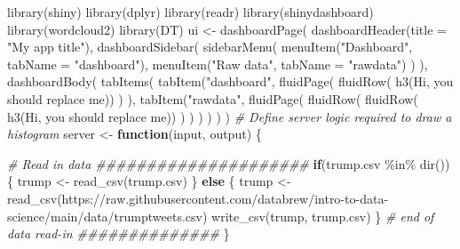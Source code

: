 \documentclass[
]{book}
\newenvironment{Shaded}{\begin{snugshade}}{\end{snugshade}}
\newcommand{\AttributeTok}[1]{\textcolor[rgb]{0.77,0.63,0.00}{#1}}
\newcommand{\CommentTok}[1]{\textcolor[rgb]{0.56,0.35,0.01}{\textit{#1}}}
\newcommand{\ControlFlowTok}[1]{\textcolor[rgb]{0.13,0.29,0.53}{\textbf{#1}}}
\newcommand{\FunctionTok}[1]{\textcolor[rgb]{0.00,0.00,0.00}{#1}}
\newcommand{\NormalTok}[1]{#1}
\newcommand{\OtherTok}[1]{\textcolor[rgb]{0.56,0.35,0.01}{#1}}
\newcommand{\SpecialCharTok}[1]{\textcolor[rgb]{0.00,0.00,0.00}{#1}}
\newcommand{\StringTok}[1]{\textcolor[rgb]{0.31,0.60,0.02}{#1}}
\begin{document}
\begin{Shaded}
\begin{Highlighting}[]
\FunctionTok{library}\NormalTok{(shiny)}
\FunctionTok{library}\NormalTok{(dplyr)}
\FunctionTok{library}\NormalTok{(readr)}
\FunctionTok{library}\NormalTok{(shinydashboard)}
\FunctionTok{library}\NormalTok{(wordcloud2)}
\FunctionTok{library}\NormalTok{(DT)}
\NormalTok{ui }\OtherTok{\textless{}{-}} \FunctionTok{dashboardPage}\NormalTok{(}
    \FunctionTok{dashboardHeader}\NormalTok{(}\AttributeTok{title =} \StringTok{"My app title"}\NormalTok{),}
    \FunctionTok{dashboardSidebar}\NormalTok{(}
        \FunctionTok{sidebarMenu}\NormalTok{(}
            \FunctionTok{menuItem}\NormalTok{(}\StringTok{"Dashboard"}\NormalTok{, }\AttributeTok{tabName =} \StringTok{"dashboard"}\NormalTok{),}
            \FunctionTok{menuItem}\NormalTok{(}\StringTok{"Raw data"}\NormalTok{, }\AttributeTok{tabName =} \StringTok{"rawdata"}\NormalTok{)}
\NormalTok{        )}
\NormalTok{    ),}
    \FunctionTok{dashboardBody}\NormalTok{(}
        \FunctionTok{tabItems}\NormalTok{(}
            \FunctionTok{tabItem}\NormalTok{(}\StringTok{"dashboard"}\NormalTok{,}
                    \FunctionTok{fluidPage}\NormalTok{(}
                        \FunctionTok{fluidRow}\NormalTok{(}
                            \FunctionTok{h3}\NormalTok{(}\StringTok{\textquotesingle{}Hi, you should replace me\textquotesingle{}}\NormalTok{))}
\NormalTok{                    )}
\NormalTok{            ),}
            \FunctionTok{tabItem}\NormalTok{(}\StringTok{"rawdata"}\NormalTok{,}
                    \FunctionTok{fluidPage}\NormalTok{(}
                        \FunctionTok{fluidRow}\NormalTok{(}
                            \FunctionTok{fluidRow}\NormalTok{(}
                                \FunctionTok{h3}\NormalTok{(}\StringTok{\textquotesingle{}Hi, you should replace me\textquotesingle{}}\NormalTok{))}
\NormalTok{                        )}
\NormalTok{                    )}
\NormalTok{            )}
\NormalTok{        )}
\NormalTok{    )}
\NormalTok{)}
\CommentTok{\# Define server logic required to draw a histogram}
\NormalTok{server }\OtherTok{\textless{}{-}} \ControlFlowTok{function}\NormalTok{(input, output) \{}
    
    \CommentTok{\# Read in data \#\#\#\#\#\#\#\#\#\#\#\#\#\#\#\#\#\#\#\#\#}
    \ControlFlowTok{if}\NormalTok{(}\StringTok{\textquotesingle{}trump.csv\textquotesingle{}} \SpecialCharTok{\%in\%} \FunctionTok{dir}\NormalTok{())\{}
\NormalTok{        trump }\OtherTok{\textless{}{-}} \FunctionTok{read\_csv}\NormalTok{(}\StringTok{\textquotesingle{}trump.csv\textquotesingle{}}\NormalTok{)}
\NormalTok{    \} }\ControlFlowTok{else}\NormalTok{ \{}
\NormalTok{        trump }\OtherTok{\textless{}{-}} \FunctionTok{read\_csv}\NormalTok{(}\StringTok{\textquotesingle{}https://raw.githubusercontent.com/databrew/intro{-}to{-}data{-}science/main/data/trumptweets.csv\textquotesingle{}}\NormalTok{)}
        \FunctionTok{write\_csv}\NormalTok{(trump, }\StringTok{\textquotesingle{}trump.csv\textquotesingle{}}\NormalTok{)}
\NormalTok{    \}}
    \CommentTok{\# end of data read{-}in  \#\#\#\#\#\#\#\#\#\#\#\#\#\#}
\NormalTok{\}}


\end{Highlighting}
\end{Shaded}
\end{document}
